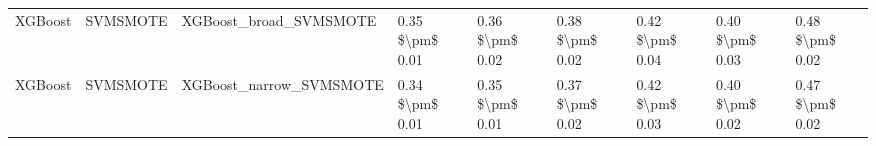 \begin{tabular}{lllllllll}
                        XGBoost &                      SVMSMOTE &                       XGBoost\_broad\_SVMSMOTE & 0.35 \$\textbackslash pm\$ 0.01 &           0.36 \$\textbackslash pm\$ 0.02 &       0.38 \$\textbackslash pm\$ 0.02 &        0.42 \$\textbackslash pm\$ 0.04 &                         0.40 \$\textbackslash pm\$ 0.03 &     0.48 \$\textbackslash pm\$ 0.02 \\
                        XGBoost &                      SVMSMOTE &                      XGBoost\_narrow\_SVMSMOTE & 0.34 \$\textbackslash pm\$ 0.01 &           0.35 \$\textbackslash pm\$ 0.01 &       0.37 \$\textbackslash pm\$ 0.02 &        0.42 \$\textbackslash pm\$ 0.03 &                         0.40 \$\textbackslash pm\$ 0.02 &     0.47 \$\textbackslash pm\$ 0.02 \\
\bottomrule
\end{tabular}
